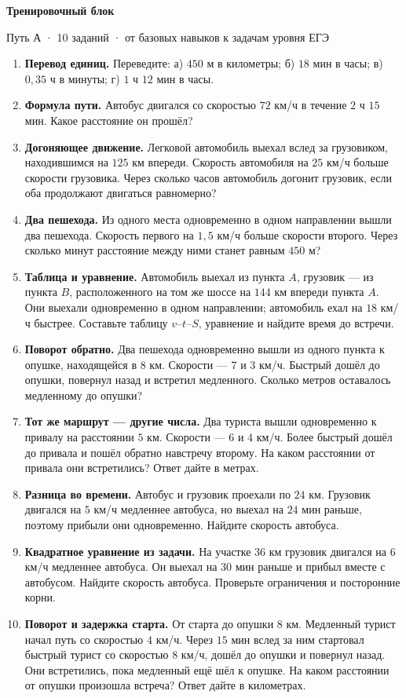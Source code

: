 \documentclass[a4paper,12pt]{article}
\newcommand{\smallnote}[1]{{\small\color{grayink}#1}}
\begin{document}
\begin{center}{\LARGE\color{darkaccent}\bfseries Тренировочный блок}\par\smallnote{Путь А · 10 заданий · от базовых навыков к задачам уровня ЕГЭ}\end{center}
\vspace{5mm}
\begin{enumerate}
\item \textbf{Перевод единиц.} Переведите: а) $450$ м в километры; б) $18$ мин в часы; в) $0{,}35$ ч в минуты; г) $1$ ч $12$ мин в часы.
\item \textbf{Формула пути.} Автобус двигался со скоростью $72$ км/ч в течение $2$ ч $15$ мин. Какое расстояние он прошёл?
\item \textbf{Догоняющее движение.} Легковой автомобиль выехал вслед за грузовиком, находившимся на $125$ км впереди. Скорость автомобиля на $25$ км/ч больше скорости грузовика. Через сколько часов автомобиль догонит грузовик, если оба продолжают двигаться равномерно?
\item \textbf{Два пешехода.} Из одного места одновременно в одном направлении вышли два пешехода. Скорость первого на $1{,}5$ км/ч больше скорости второго. Через сколько минут расстояние между ними станет равным $450$ м?
\item \textbf{Таблица и уравнение.} Автомобиль выехал из пункта $A$, грузовик --- из пункта $B$, расположенного на том же шоссе на $144$ км впереди пункта $A$. Они выехали одновременно в одном направлении; автомобиль ехал на $18$ км/ч быстрее. Составьте таблицу $v$--$t$--$S$, уравнение и найдите время до встречи.
\item \textbf{Поворот обратно.} Два пешехода одновременно вышли из одного пункта к опушке, находящейся в $8$ км. Скорости --- $7$ и $3$ км/ч. Быстрый дошёл до опушки, повернул назад и встретил медленного. Сколько метров оставалось медленному до опушки?
\item \textbf{Тот же маршрут --- другие числа.} Два туриста вышли одновременно к привалу на расстоянии $5$ км. Скорости --- $6$ и $4$ км/ч. Более быстрый дошёл до привала и пошёл обратно навстречу второму. На каком расстоянии от привала они встретились? Ответ дайте в метрах.
\item \textbf{Разница во времени.} Автобус и грузовик проехали по $24$ км. Грузовик двигался на $5$ км/ч медленнее автобуса, но выехал на $24$ мин раньше, поэтому прибыли они одновременно. Найдите скорость автобуса.
\item \textbf{Квадратное уравнение из задачи.} На участке $36$ км грузовик двигался на $6$ км/ч медленнее автобуса. Он выехал на $30$ мин раньше и прибыл вместе с автобусом. Найдите скорость автобуса. Проверьте ограничения и посторонние корни.
\item \textbf{Поворот и задержка старта.} От старта до опушки $8$ км. Медленный турист начал путь со скоростью $4$ км/ч. Через $15$ мин вслед за ним стартовал быстрый турист со скоростью $8$ км/ч, дошёл до опушки и повернул назад. Они встретились, пока медленный ещё шёл к опушке. На каком расстоянии от опушки произошла встреча? Ответ дайте в километрах.
\end{enumerate}
\end{document}
